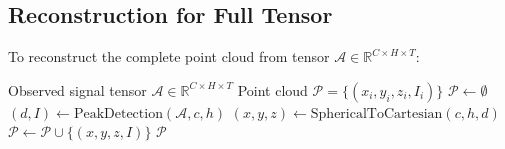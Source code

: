 \documentclass[11pt]{article}
\begin{document}
\subsection{Reconstruction for Full Tensor}

To reconstruct the complete point cloud from tensor $\bm{\mathcal{A}} \in \mathbb{R}^{C \times H \times T}$:

\begin{algorithm}
\caption{Full Point Cloud Reconstruction}
\begin{algorithmic}[1]
\REQUIRE Observed signal tensor $\bm{\mathcal{A}} \in \mathbb{R}^{C \times H \times T}$
\ENSURE Point cloud $\mathcal{P} = \{(x_i, y_i, z_i, I_i)\}$
\STATE $\mathcal{P} \gets \emptyset$
        \STATE $(d, I) \gets \text{PeakDetection}(\bm{\mathcal{A}}, c, h)$ 
            \STATE $(x, y, z) \gets \text{SphericalToCartesian}(c, h, d)$
            \STATE $\mathcal{P} \gets \mathcal{P} \cup \{(x, y, z, I)\}$
        \ENDIF
    \ENDFOR
\ENDFOR
\RETURN $\mathcal{P}$
\end{algorithmic}
\end{algorithm}
\end{document}
